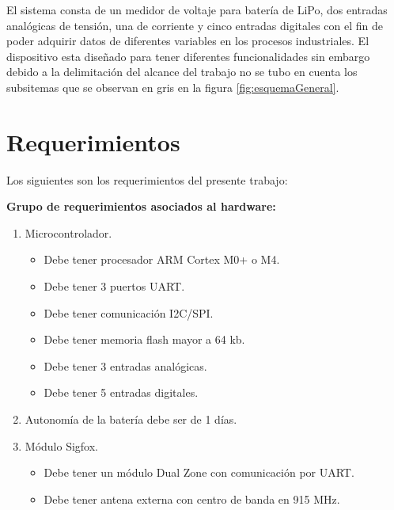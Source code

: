 El sistema consta de un medidor de voltaje para batería de LiPo, dos entradas analógicas de tensión, una de corriente y cinco entradas digitales con el fin de poder adquirir datos de diferentes variables en los procesos industriales. El dispositivo esta diseñado para tener diferentes funcionalidades sin embargo debido a la delimitación del alcance del trabajo no se tubo en cuenta los subsitemas que se observan en gris en la figura \ref{fig:esquemaGeneral}.


\section{Requerimientos}
Los siguientes son los requerimientos del presente trabajo:

\textbf{Grupo de requerimientos asociados al hardware:}
\begin{enumerate}

	\item Microcontrolador.

	\begin{itemize}

		\item Debe tener procesador ARM Cortex M0+ o M4.

		\item Debe tener 3 puertos UART.

		\item Debe tener comunicación I2C/SPI.

		\item Debe tener memoria flash mayor a 64 kb.

		\item Debe tener 3 entradas analógicas.

		\item Debe tener 5 entradas digitales.

	\end{itemize}


	\item Autonomía de la batería debe ser de 1 días.

	\item Módulo Sigfox.

		\begin{itemize}

			\item Debe tener un módulo Dual Zone con comunicación por UART.

			\item Debe tener antena externa con centro de banda en 915 MHz.


\end{itemize}
\end{enumerate}
